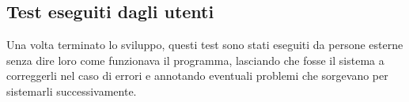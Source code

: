 \documentclass{article}
\begin{document}
    \subsection{Test eseguiti dagli utenti}

     Una volta terminato lo sviluppo, questi test sono stati eseguiti da persone esterne senza dire loro come funzionava il programma, lasciando che fosse il sistema a correggerli nel caso di errori e annotando eventuali problemi che sorgevano per sistemarli successivamente.
    
\end{document}
